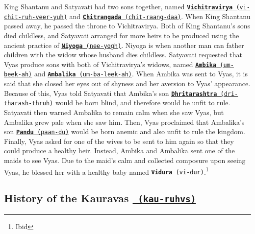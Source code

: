 \documentclass[10pt, letterpaper]{article}
\begin{document}
King Shantanu and Satyavati had two sons together, named
\texttt{\underline{\href{https://drive.google.com/file/d/1ZE4rzdRU4OGeMofDFrix5tO9c8AlmrqB/view?usp=sharing}{\textbf{Vichitravirya}}
(vi-chit-ruh-veer-yuh)}} and
\texttt{\underline{\href{https://drive.google.com/file/d/13KRNPmCrKWRmb9dF9hgtAD0gQqaVsn4l/view?usp=sharing}{\textbf{Chitrangada}}
(chit-raang-daa)}}. When King Shantanu passed away, he passed the throne
to Vichitravirya. Both of King Shantanu's sons died childless, and
Satyavati arranged for more heirs to be produced using the ancient
practice of
\texttt{\underline{\href{https://drive.google.com/file/d/1mzZ2rCXC8DK4eaNB586vkcrfG5IlpvC3/view?usp=sharing}{\textbf{Niyoga}}
(nee-yogh)}}. Niyoga is when another man can father children with the
widow whose husband dies childless. Satyavati requested that Vyas
produce sons with both of Vichitravirya's widows, named
\texttt{\underline{\href{https://drive.google.com/file/d/1WC1iP0uX5S0hR5Az2hL8e8EoiWK_QMH4/view?usp=sharing}{\textbf{Ambika}}
(um-beek-ah)}} and
\texttt{\underline{\href{https://drive.google.com/file/d/18X8b4SJRXKLsA0hl72osL-HCopTfo_eQ/view?usp=sharing}{\textbf{Ambalika}}
(um-ba-leek-ah)}}. When Ambika was sent to Vyas, it is said that she
closed her eyes out of shyness and her aversion to Vyas' appearance.
Because of this, Vyas told Satyavati that Ambika's son
\texttt{\underline{\href{https://drive.google.com/file/d/1GMnpGiv2kfdLG2qlgDb0rvvrhwiAxwIf/view?usp=sharing}{\textbf{Dhritarashtra}}
(dri-tharash-thruh)}} would be born blind, and therefore would be unfit
to rule. Satyavati then warned Ambalika to remain calm when she saw
Vyas, but Ambalika grew pale when she saw him. Then, Vyas proclaimed
that Ambalika's son
\texttt{\underline{\href{https://drive.google.com/file/d/1aFWNBQKaua-edsIzc3RcmaoEFGVQs0Td/view?usp=sharing}{\textbf{Pandu}}
(paan-du)}} would be born anemic and also unfit to rule the kingdom.
Finally, Vyas asked for one of the wives to be sent to him again so that
they could produce a healthy heir. Instead, Ambika and Ambalika sent one
of the maids to see Vyas. Due to the maid's calm and collected composure
upon seeing Vyas, he blessed her with a healthy baby named
\texttt{\underline{\href{https://drive.google.com/file/d/1NhyX-PaApdpWOtrL1TMxd2-TPazUcA8v/view?usp=sharing}{\textbf{Vidura}}
(vi-dur)}}.\footnote{Ibid} \\

\newpage
\subsection{History of the Kauravas \texttt{\href{https://drive.google.com/file/d/1ptzaOxqQtvT8BU7IC_lnXLczsqRelJKU/view?usp=sharing}{
(kau-ruhvs)}}}
\end{document}
